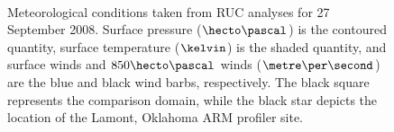 \begin{figure}[H]
     \begin{center}
%
        \\ %
%
    \end{center}
    \caption{%
        Meteorological conditions taken from RUC analyses for 27 September 2008. Surface pressure ($\hecto\pascal$) is the contoured quantity, surface temperature ($\kelvin$) is the shaded quantity, and surface winds and $850\hecto\pascal$ winds ($\metre\per\second$) are the blue and black wind barbs, respectively. The black square represents the comparison domain, while the black star depicts the location of the Lamont, Oklahoma ARM profiler site.}%
   \label{figure410}
\end{figure}


